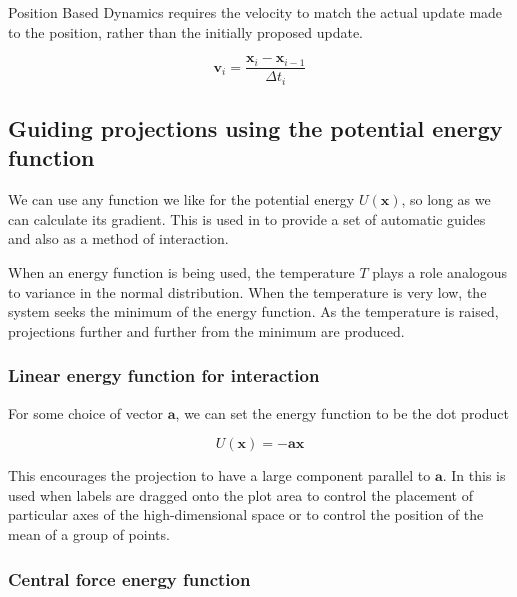 Position Based Dynamics requires the velocity to match the actual update made to the position, rather than the initially proposed update.

\begin{equation*}
\mathbf v_i = \frac{\mathbf x_i - \mathbf x_{i-1}}{\Delta t_i}
\end{equation*}

\hypertarget{guiding-projections-using-the-potential-energy-function}{%
\subsection{Guiding projections using the potential energy function}\label{guiding-projections-using-the-potential-energy-function}}

We can use any function we like for the potential energy \(U(\mathbf x)\), so long as we can calculate its gradient. This is used in  to provide a set of automatic guides and also as a method of interaction.

When an energy function is being used, the temperature \(T\) plays a role analogous to variance in the normal distribution. When the temperature is very low, the system seeks the minimum of the energy function. As the temperature is raised, projections further and further from the minimum are produced.

\hypertarget{linear-energy-function-for-interaction}{%
\subsubsection{Linear energy function for interaction}\label{linear-energy-function-for-interaction}}

For some choice of vector \(\mathbf a\), we can set the energy function to be the dot product

\begin{equation*}
U(\mathbf x) = - \mathbf a \mathbf x
\end{equation*}

This encourages the projection to have a large component parallel to \(\mathbf a\). In  this is used when labels are dragged onto the plot area to control the placement of particular axes of the high-dimensional space or to control the position of the mean of a group of points.

\hypertarget{central-force-energy-function}{%
\subsubsection{Central force energy function}\label{central-force-energy-function}}

